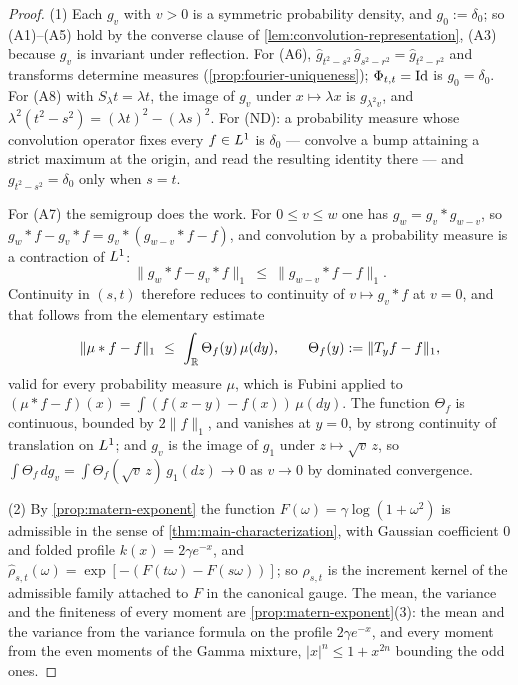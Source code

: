 \begin{proof}
\leanok
(1) Each $g_v$ with $v > 0$ is a symmetric probability density, and $g_0 := \delta_0$; so
(A1)--(A5) hold by the converse clause of \ref{lem:convolution-representation}, (A3) because
$g_v$ is invariant under reflection. For (A6),
$\hat g_{t^2-s^2}\,\hat g_{s^2-r^2} = \hat g_{t^2-r^2}$ and transforms determine measures
(\ref{prop:fourier-uniqueness}); $\Phi_{t,t} = \mathrm{Id}$ is $g_0 = \delta_0$. For (A8) with
$S_\lambda t = \lambda t$, the image of $g_v$ under $x \mapsto \lambda x$ is $g_{\lambda^2 v}$,
and $\lambda^2(t^2 - s^2) = (\lambda t)^2 - (\lambda s)^2$. For (ND): a probability measure whose
convolution operator fixes every $f \in L^1$ is $\delta_0$ --- convolve a bump attaining a
strict maximum at the origin, and read the resulting identity there --- and $g_{t^2-s^2} =
\delta_0$ only when $s = t$.

For (A7) the semigroup does the work. For $0 \le v \le w$ one has $g_w = g_v * g_{w-v}$, so
$g_w * f - g_v * f = g_v * (g_{w-v} * f - f)$, and convolution by a probability measure is a
contraction of $L^1$:
\[
  \| g_w * f - g_v * f \|_1 \ \le\ \| g_{w-v} * f - f \|_1 .
\]
Continuity in $(s,t)$ therefore reduces to continuity of $v \mapsto g_v * f$ at $v = 0$, and that
follows from the elementary estimate
\[
  \| \mu * f - f \|_1 \ \le\ \int_{\mathbb{R}} \Theta_f(y)\, \mu(dy),
  \qquad \Theta_f(y) := \| T_{y} f - f \|_1,
\]
valid for every probability measure $\mu$, which is Fubini applied to
$(\mu * f - f)(x) = \int (f(x-y) - f(x))\,\mu(dy)$. The function $\Theta_f$ is continuous,
bounded by $2\|f\|_1$, and vanishes at $y = 0$, by strong continuity of translation on $L^1$;
and $g_v$ is the image of $g_1$ under $z \mapsto \sqrt{v}\,z$, so
$\int \Theta_f\,dg_v = \int \Theta_f(\sqrt{v}\,z)\,g_1(dz) \to 0$ as $v \to 0$ by dominated
convergence.

(2) By \ref{prop:matern-exponent} the function $F(\omega) = \gamma\log(1 + \omega^2)$ is
admissible in the sense of \ref{thm:main-characterization}, with Gaussian coefficient $0$ and
folded profile $k(x) = 2\gamma e^{-x}$, and
$\hat\rho_{s,t}(\omega) = \exp[-(F(t\omega) - F(s\omega))]$; so $\rho_{s,t}$ is the increment
kernel of the admissible family attached to $F$ in the canonical gauge. The mean, the variance
and the finiteness of every moment are \ref{prop:matern-exponent}(3): the mean and the variance
from the variance formula on the profile $2\gamma e^{-x}$, and every moment from the even
moments of the Gamma mixture, $|x|^n \le 1 + x^{2n}$ bounding the odd ones.


\end{proof}
